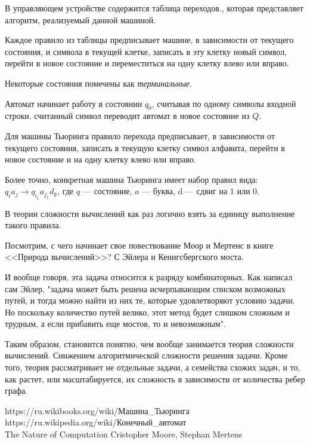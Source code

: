 \documentclass{article}
\begin{document}
В управляющем устройстве содержится таблица переходов., которая представляет алгоритм, реализуемый данной машиной.

Каждое правило из таблицы предписывает машине, в зависимости от текущего состояния, и символа в текущей клетке, записать в эту клетку новый символ, перейти в новое состояние и переместиться на одну клетку влево или вправо.

Некоторые состояния помечены как \textit{терминальные}. 

Автомат начинает работу в состоянии $q_0$, считывая по одному символы входной строки. считанный символ переводит автомат в новое состояние из $Q$. 

Для машины Тьюринга правило перехода предписывает, в зависимости от текущего состояния, записать в текущую клетку символ алфавита, перейти в новое состояние и на одну клетку влево или вправо.

Более точно, конкретная машина Тьюринга имеет набор правил вида: ${q_i}{a_j}\to {q_i_1}{a_j_1}{d_k}$, где $q$ --- состояние, $a$ --- буква, d --- сдвиг на $1$ или $0$.

В теории сложности вычислений как раз логично взять за единицу выполнение такого правила.

Посмотрим, с чего начинает свое повествование Моор и Мертенс в книге <<Природа вычислений>>? С Эйлера и Кенигсбергского моста. 

И вообще говоря, эта задача относится к разряду комбинаторных. Как написал сам Эйлер, "задача может быть решена исчерпывающим списком возможных путей, и тогда можно найти из них те, которые удовлетворяют условию задачи. Но поскольку количество путей велико, этот метод будет слишком сложным и трудным, а если прибавить еще мостов, то и невозможным".

Таким образом, становится понятно, чем вообще занимается теория сложности вычислений. Снижением алгоритмической сложности решения задачи. Кроме того, теория рассматривает не отдельные задачи, а семейства схожих задач, и то, как растет, или масштабируется, их сложность  в зависимости от количества ребер графа.







https://ru.wikibooks.org/wiki/Машина_Тьюринга\\
https://ru.wikipedia.org/wiki/Конечный_автомат\\
The Nature of Computation Cristopher Moore, Stephan Mertens
\end{document}
